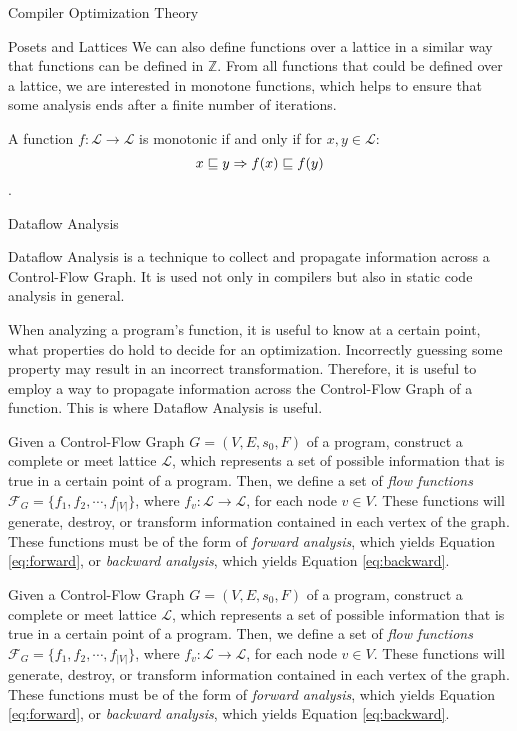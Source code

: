 \begin{section}{Compiler Optimization Theory}
\begin{subsection}{Posets and Lattices}
We can also define functions over a lattice in a similar way that functions can
be defined in $\mathbb{Z}$. From all functions that could be defined over a
lattice, we are interested in monotone functions, which helps to ensure that
some analysis ends after a finite number of iterations.

\begin{definition}
	A function $f:\mathcal{L} \longrightarrow \mathcal{L}$ is monotonic if and only if
	for $x, y \in \mathcal{L}$:
	$$x \sqsubseteq y \Rightarrow f(x) \sqsubseteq f(y)$$.
\end{definition}

\end{subsection}

\begin{subsection}{Dataflow Analysis}

Dataflow Analysis is a technique to collect and propagate information across a
Control-Flow Graph. It is used not only in compilers but also in static code
analysis in general.

When analyzing a program's function, it is useful to know at a certain point,
what properties do hold to decide for an optimization.  Incorrectly guessing
some property may result in an incorrect transformation. Therefore, it is
useful to employ a way to propagate information across the Control-Flow Graph
of a function. This is where Dataflow Analysis is useful.

Given a Control-Flow Graph $G = (V, E, s_0, F)$ of a program, construct a
complete or meet lattice $\mathcal{L}$, which represents a set of possible
information that is true in a certain point of a program.  Then, we define a
set of \textit{flow functions} $\mathcal{F}_G = \{f_1, f_2, \cdots, f_{|V|}\}$,
where $f_v: \mathcal{L} \longrightarrow \mathcal{L}$, for each node $v \in V$.
These functions will generate, destroy, or transform information contained in
each vertex of the graph. These functions must be of the form of
\textit{forward analysis}, which yields Equation \ref{eq:forward}, or
\textit{backward analysis}, which yields Equation \ref{eq:backward}.

Given a Control-Flow Graph $G = (V, E, s_0, F)$ of a program, construct a
complete or meet lattice $\mathcal{L}$, which represents a set of possible
information that is true in a certain point of a program.  Then, we define a
set of \textit{flow functions} $\mathcal{F}_G = \{f_1, f_2, \cdots, f_{|V|}\}$,
where $f_v: \mathcal{L} \longrightarrow \mathcal{L}$, for each node $v \in V$.
These functions will generate, destroy, or transform information contained in
each vertex of the graph. These functions must be of the form of
\textit{forward analysis}, which yields Equation \ref{eq:forward}, or
\textit{backward analysis}, which yields Equation \ref{eq:backward}.


\end{subsection}
\end{section}
